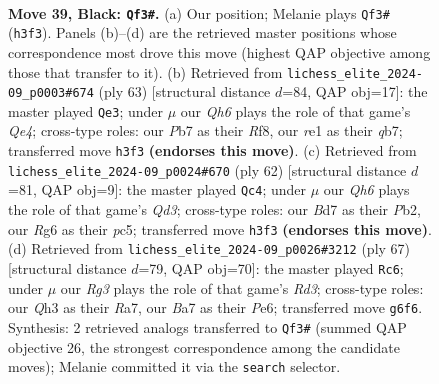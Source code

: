 \documentclass[11pt]{article}
\begin{document}
\clearpage

\begin{figure}[p]\centering
\begin{subfigure}{0.46\textwidth}\centering
\resizebox{\linewidth}{!}{%
\newchessgame
\chessboard[
  setfen={r6k/bp1b4/p3p1rp/8/8/BP1p3q/PR3P1P/4R2K b - - 1 39},
  showmover=false,
  pgfstyle=straightmove, color=movearrow, markmove={h3-f3}
]}
\caption{}
\end{subfigure}\hfill
\begin{subfigure}{0.46\textwidth}\centering
\resizebox{\linewidth}{!}{%
\newchessgame
\chessboard[
  setfen={5rk1/1Q4p1/3r4/2p1q3/P1Pp4/5Pp1/4P1K1/2R1R3 b - - 0 32},
  showmover=false,
  pgfstyle=straightmove, color=movearrow, markmove={e5-e3}
]}
\caption{}
\end{subfigure}
\\[4pt]
\begin{subfigure}{0.46\textwidth}\centering
\resizebox{\linewidth}{!}{%
\newchessgame
\chessboard[
  setfen={1k4r1/1p2b1r1/p3p2p/2p1P2B/P4P2/3Q4/1P3RP1/6K1 w - - 1 32},
  showmover=false,
  pgfstyle=straightmove, color=movearrow, markmove={d3-c4}
]}
\caption{}
\end{subfigure}\hfill
\begin{subfigure}{0.46\textwidth}\centering
\resizebox{\linewidth}{!}{%
\newchessgame
\chessboard[
  setfen={8/r4k1p/Pp1rp1pb/8/2B5/6P1/3p1P1P/R2R2K1 b - - 4 34},
  showmover=false,
  pgfstyle=straightmove, color=movearrow, markmove={d6-c6}
]}
\caption{}
\end{subfigure}
\caption{\textbf{Move 39, Black: \texttt{Qf3\#}.} (a) Our position; Melanie plays \texttt{Qf3\#} (\texttt{h3f3}). Panels (b)--(d) are the retrieved master positions whose correspondence most drove this move (highest QAP objective among those that transfer to it). (b) Retrieved from \texttt{lichess\_elite\_2024-09\_p0003\#674} (ply 63) [structural distance $d$=84, QAP obj=17]: the master played \texttt{Qe3}; under $\mu$ our \emph{Qh6} plays the role of that game's \emph{Qe4}; cross-type roles: our \emph{P}b7 as their \emph{R}f8, our \emph{r}e1 as their \emph{q}b7; transferred move \texttt{h3f3} \textbf{(endorses this move)}. (c) Retrieved from \texttt{lichess\_elite\_2024-09\_p0024\#670} (ply 62) [structural distance $d$=81, QAP obj=9]: the master played \texttt{Qc4}; under $\mu$ our \emph{Qh6} plays the role of that game's \emph{Qd3}; cross-type roles: our \emph{B}d7 as their \emph{P}b2, our \emph{R}g6 as their \emph{p}c5; transferred move \texttt{h3f3} \textbf{(endorses this move)}. (d) Retrieved from \texttt{lichess\_elite\_2024-09\_p0026\#3212} (ply 67) [structural distance $d$=79, QAP obj=70]: the master played \texttt{Rc6}; under $\mu$ our \emph{Rg3} plays the role of that game's \emph{Rd3}; cross-type roles: our \emph{Q}h3 as their \emph{R}a7, our \emph{B}a7 as their \emph{P}e6; transferred move \texttt{g6f6}. Synthesis: 2 retrieved analogs transferred to \texttt{Qf3\#} (summed QAP objective 26, the strongest correspondence among the candidate moves); Melanie committed it via the \texttt{search} selector.}
\label{fig:thought-m77}
\end{figure}
\end{document}
